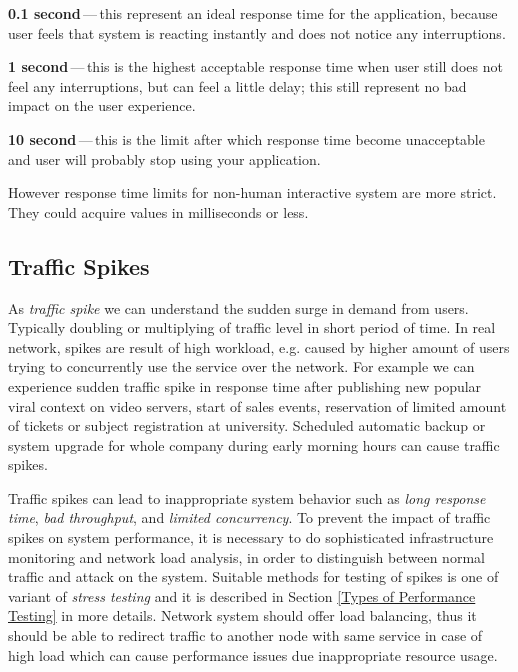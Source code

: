 \begin{description}
	\setlength\itemsep{0em}
	\item \textbf{0.1 second}\,---\,this represent an ideal response time for the application, because user feels that system is reacting instantly and does not notice any interruptions.
	\item \textbf{1 second}\,---\,this is the highest acceptable response time when user still does not feel any interruptions, but can feel a little delay; this still represent no bad impact on the user experience.
	\item \textbf{10 second}\,---\,this is the limit after which response time become unacceptable and user will probably stop using your application.
\end{description}

However response time limits for non-human interactive system are more strict. They could acquire values in milliseconds or less.


\subsection*{Traffic Spikes}
As \emph{traffic spike} \cite{Kurkova:Thesis:2017, AMC:SPIKES} we can understand the sudden surge in demand from users. Typically doubling or multiplying of traffic level in short period of time. In real network, spikes are result of high workload, e.g. caused by higher amount of users trying to concurrently use the service over the network. For example we can experience sudden traffic spike in response time after publishing new popular viral context on video servers, start of sales events, reservation of limited amount of tickets or subject registration at university. Scheduled automatic backup or system upgrade for whole company during early morning hours can cause traffic spikes.

Traffic spikes can lead to inappropriate system behavior such as \emph{long response time}, \emph{bad throughput}, and \emph{limited concurrency}. To prevent the impact of traffic spikes on system performance, it is  necessary to do sophisticated infrastructure monitoring and network load analysis, in order to distinguish between normal traffic and attack on the system. Suitable methods for testing of spikes is one of variant of \emph{stress testing} \cite{Manzor:APTB} and it is described in Section \ref{Types of Performance Testing} in more details. Network system should offer load balancing, thus it should be able to redirect traffic to another node with same service in case of high load which can cause performance issues due inappropriate resource usage.

